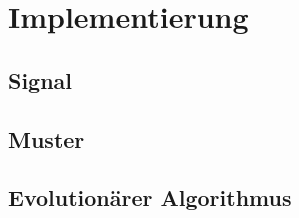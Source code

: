 
\chapter{Implementierung}
\label{ch:Implementierung}

\section{Signal}
\label{ch:Implementierung:sec:Signal}




\section{Muster}
\label{ch:Implementierung:sec:Muster}





\section{Evolution{\"a}rer Algorithmus}
\label{ch:Implementierung:sec:Evolution{\"a}rer Algorithmus}





